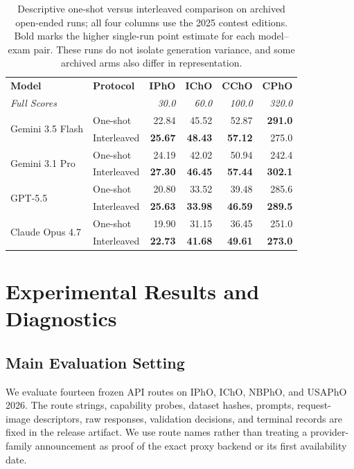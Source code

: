 \documentclass[11pt]{article}
\begin{document}
\begin{table}[t]
\vspace{-0cm}
\centering
\scriptsize
\setlength{\tabcolsep}{5pt}
\renewcommand{\arraystretch}{1.08}
\begin{tabular}{l|l|r r r r}
\toprule
\textbf{Model} & \textbf{Protocol} & \textbf{IPhO} & \textbf{IChO} & \textbf{CChO} & \textbf{CPhO} \\
\multicolumn{2}{l}{\textit{Full Scores}} & \textit{30.0} & \textit{60.0} & \textit{100.0} & \textit{320.0} \\
\midrule
\multirow{2}{*}{Gemini 3.5 Flash}
  & One-shot & 22.84 & 45.52 & 52.87 & \textbf{291.0} \\
  & Interleaved & \textbf{25.67} & \textbf{48.43} & \textbf{57.12} & 275.0 \\
\midrule
\multirow{2}{*}{Gemini 3.1 Pro}
  & One-shot & 24.19 & 42.02 & 50.94 & 242.4 \\
  & Interleaved & \textbf{27.30} & \textbf{46.45} & \textbf{57.44} & \textbf{302.1} \\
\midrule
\multirow{2}{*}{GPT-5.5}
  & One-shot & 20.80 & 33.52 & 39.48 & 285.6 \\
  & Interleaved & \textbf{25.63} & \textbf{33.98} & \textbf{46.59} & \textbf{289.5} \\
\midrule
\multirow{2}{*}{Claude Opus 4.7}
  & One-shot & 19.90 & 31.15 & 36.45 & 251.0 \\
  & Interleaved & \textbf{22.73} & \textbf{41.68} & \textbf{49.61} & \textbf{273.0} \\
\bottomrule
\end{tabular}
\vspace{-0.4em}
\caption{Descriptive one-shot versus interleaved comparison on archived open-ended runs; all four columns use the 2025 contest editions. Bold marks the higher single-run point estimate for each model--exam pair. These runs do not isolate generation variance, and some archived arms also differ in representation.}
\label{tab:oneshot-interleaved-ablation}
\vspace{-0.4cm}
\end{table}




\section{Experimental Results and Diagnostics}
\label{sec:3}

\subsection{Main Evaluation Setting}
We evaluate fourteen frozen API routes on IPhO, IChO, NBPhO, and USAPhO 2026. The route strings, capability probes, dataset hashes, prompts, request-image descriptors, raw responses, validation decisions, and terminal records are fixed in the release artifact. We use route names rather than treating a provider-family announcement as proof of the exact proxy backend or its first availability date.
\end{document}
